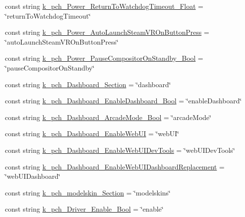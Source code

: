\begin{DoxyCompactItemize}
\item 
const string \mbox{\hyperlink{class_valve_1_1_v_r_1_1_open_v_r_aad8e0b5e9a3b7dedc817dc3da8c65c0c}{k\+\_\+pch\+\_\+\+Power\+\_\+\+Return\+To\+Watchdog\+Timeout\+\_\+\+Float}} = \char`\"{}return\+To\+Watchdog\+Timeout\char`\"{}
\item 
const string \mbox{\hyperlink{class_valve_1_1_v_r_1_1_open_v_r_a2db0e8ebee9163a2483ea6b734ca39db}{k\+\_\+pch\+\_\+\+Power\+\_\+\+Auto\+Launch\+Steam\+V\+R\+On\+Button\+Press}} = \char`\"{}auto\+Launch\+Steam\+V\+R\+On\+Button\+Press\char`\"{}
\item 
const string \mbox{\hyperlink{class_valve_1_1_v_r_1_1_open_v_r_abfb5a6077c77d552f71cd4e10e38e805}{k\+\_\+pch\+\_\+\+Power\+\_\+\+Pause\+Compositor\+On\+Standby\+\_\+\+Bool}} = \char`\"{}pause\+Compositor\+On\+Standby\char`\"{}
\item 
const string \mbox{\hyperlink{class_valve_1_1_v_r_1_1_open_v_r_aecd2e5114c07fdaa9983b1fed8933ca9}{k\+\_\+pch\+\_\+\+Dashboard\+\_\+\+Section}} = \char`\"{}dashboard\char`\"{}
\item 
const string \mbox{\hyperlink{class_valve_1_1_v_r_1_1_open_v_r_aef4d14ca2da6f51a31d11e86ccd55c9f}{k\+\_\+pch\+\_\+\+Dashboard\+\_\+\+Enable\+Dashboard\+\_\+\+Bool}} = \char`\"{}enable\+Dashboard\char`\"{}
\item 
const string \mbox{\hyperlink{class_valve_1_1_v_r_1_1_open_v_r_afb84a2319572d3ebe8aeb3f3f2b78597}{k\+\_\+pch\+\_\+\+Dashboard\+\_\+\+Arcade\+Mode\+\_\+\+Bool}} = \char`\"{}arcade\+Mode\char`\"{}
\item 
const string \mbox{\hyperlink{class_valve_1_1_v_r_1_1_open_v_r_a445dfe6b7badb0c20737462ac075cdf8}{k\+\_\+pch\+\_\+\+Dashboard\+\_\+\+Enable\+Web\+UI}} = \char`\"{}web\+UI\char`\"{}
\item 
const string \mbox{\hyperlink{class_valve_1_1_v_r_1_1_open_v_r_a4105775ce382934434d20ec6d0356e34}{k\+\_\+pch\+\_\+\+Dashboard\+\_\+\+Enable\+Web\+U\+I\+Dev\+Tools}} = \char`\"{}web\+U\+I\+Dev\+Tools\char`\"{}
\item 
const string \mbox{\hyperlink{class_valve_1_1_v_r_1_1_open_v_r_a9ac3201e795ddea0250e3d95db00defa}{k\+\_\+pch\+\_\+\+Dashboard\+\_\+\+Enable\+Web\+U\+I\+Dashboard\+Replacement}} = \char`\"{}web\+U\+I\+Dashboard\char`\"{}
\item 
const string \mbox{\hyperlink{class_valve_1_1_v_r_1_1_open_v_r_a7047defbf9bb341af52f959abb7b8fa3}{k\+\_\+pch\+\_\+modelskin\+\_\+\+Section}} = \char`\"{}modelskins\char`\"{}
\item 
const string \mbox{\hyperlink{class_valve_1_1_v_r_1_1_open_v_r_a04ad20fe77663e39d7cdba7a4303be09}{k\+\_\+pch\+\_\+\+Driver\+\_\+\+Enable\+\_\+\+Bool}} = \char`\"{}enable\char`\"{}

\end{DoxyCompactItemize}
